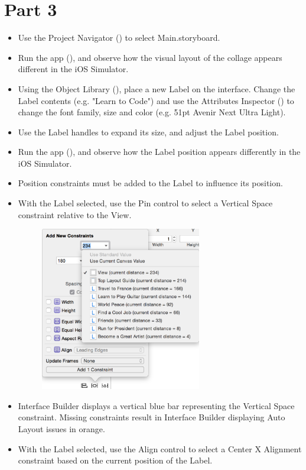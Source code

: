 \documentclass[a4paper,11pt]{scrartcl}
\begin{document}
\section*{Part 3}

\begin{itemize}
\item Use the Project Navigator () to select Main.storyboard.
\item Run the app (), and observe how the visual layout of the collage appears different in the iOS Simulator.
\item Using the Object Library (), place a new Label on the interface. Change the Label contents (e.g. "Learn to Code") and use the Attributes Inspector () to change the font family, size and color (e.g. 51pt Avenir Next Ultra Light).
\item Use the Label handles to expand its size, and adjust the Label position.
\item Run the app (), and observe how the Label position appears differently in the iOS Simulator.
\item Position constraints must be added to the Label to influence its position.
\item With the Label selected, use the Pin control to select a Vertical Space constraint relative to the View.
\begin{figure}[h]
	\begin{center}
   \includegraphics[width=200pt]{pin_constraint.png}
	\end{center}
\end{figure}
\item Interface Builder displays a vertical blue bar representing the Vertical Space constraint. Missing constraints result in Interface Builder displaying Auto Layout issues in orange.
\item With the Label selected, use the Align control to select a Center X Alignment constraint based on the current position of the Label.

\end{itemize}
\end{document}
